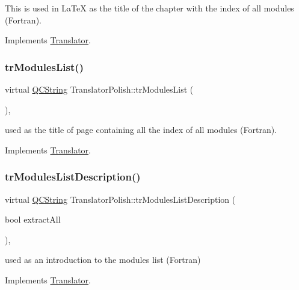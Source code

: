 This is used in La\+TeX as the title of the chapter with the index of all modules (Fortran). 

Implements \mbox{\hyperlink{class_translator}{Translator}}.

\mbox{\label{class_translator_polish_a47ca5b246c223fbc328a4cfef594b33b}} 
\subsubsection{\texorpdfstring{trModulesList()}{trModulesList()}}
{\footnotesize\ttfamily virtual \mbox{\hyperlink{class_q_c_string}{Q\+C\+String}} Translator\+Polish\+::tr\+Modules\+List (\begin{DoxyParamCaption}{ }\end{DoxyParamCaption})\hspace{0.3cm}{\ttfamily [inline]}, {\ttfamily [virtual]}}

used as the title of page containing all the index of all modules (Fortran). 

Implements \mbox{\hyperlink{class_translator}{Translator}}.

\mbox{\label{class_translator_polish_abe9b65112ac36ccb30f5cbc9319080c3}} 
\subsubsection{\texorpdfstring{trModulesListDescription()}{trModulesListDescription()}}
{\footnotesize\ttfamily virtual \mbox{\hyperlink{class_q_c_string}{Q\+C\+String}} Translator\+Polish\+::tr\+Modules\+List\+Description (\begin{DoxyParamCaption}\item[{bool}]{extract\+All }\end{DoxyParamCaption})\hspace{0.3cm}{\ttfamily [inline]}, {\ttfamily [virtual]}}

used as an introduction to the modules list (Fortran) 

Implements \mbox{\hyperlink{class_translator}{Translator}}.

